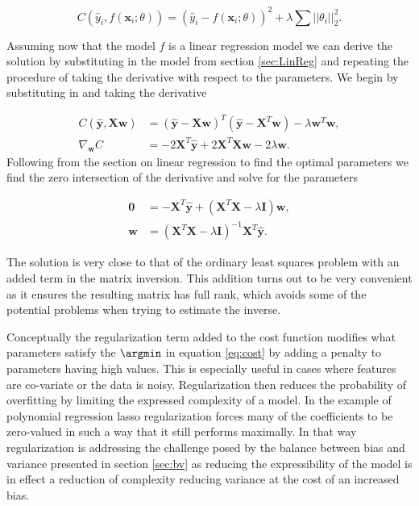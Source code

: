 \begin{equation}\label{eq:mse_ridge}
C(\hat{y}_i, f(\mathbf{x}_i; \theta)) = (\hat{y}_i - f(\mathbf{x}_i; \theta))^2 + \lambda\sum||\theta_i||^2_2.
\end{equation}

\noindent Assuming now that the model $f$ is a linear regression model we can derive the solution by substituting in the model from section \ref{sec:LinReg} and repeating the procedure of taking the derivative with respect to the parameters. We begin by substituting in and taking the derivative 

\begin{align}
C(\mathbf{\hat{y}}, \mathbf{Xw}) &= ( \mathbf{\hat{y}} - \mathbf{Xw})^T( \mathbf{\hat{y}} - \mathbf{X}^T\mathbf{w}) - \lambda \mathbf{w}^T\mathbf{w}, \\
\nabla_\mathbf{w} C &= -2\mathbf{X}^T\mathbf{\hat{y}} + 2\mathbf{X}^T\mathbf{Xw} - 2\lambda\mathbf{w}. 
\end{align}
\noindent Following from the section on linear regression to find the optimal parameters we find the zero intersection of the derivative and solve for the parameters 

\begin{align}
\mathbf{0} &=  -\mathbf{X}^T\mathbf{\hat{y}} + (\mathbf{X}^T\mathbf{X} - \lambda \mathbf{I})\mathbf{w}, \\
\mathbf{w} &= (\mathbf{X}^T\mathbf{X} - \lambda \mathbf{I})^{-1}\mathbf{X}^T\mathbf{\hat{y}}.
\end{align}

\noindent The solution is very close to that of the ordinary least squares problem with an added term in the matrix inversion. This addition turns out to be very convenient as it ensures the resulting matrix has full rank, which avoids some of the potential problems when trying to estimate the inverse. 

Conceptually the regularization term added to the cost function modifies what parameters satisfy the $\argmin$ in equation \ref{eq:cost} by adding a penalty to parameters having high values. This is especially useful in cases where features are co-variate or the data is noisy. 
Regularization then reduces the probability of overfitting by limiting the expressed complexity of a model. In the example of polynomial regression lasso regularization forces many of the coefficients to be zero-valued in such a way that it still performs maximally. In that way regularization is addressing the challenge posed by the balance between bias and variance presented in section \ref{sec:bv} as reducing the expressibility of the model is in effect a reduction of complexity reducing variance at the cost of an increased bias.
